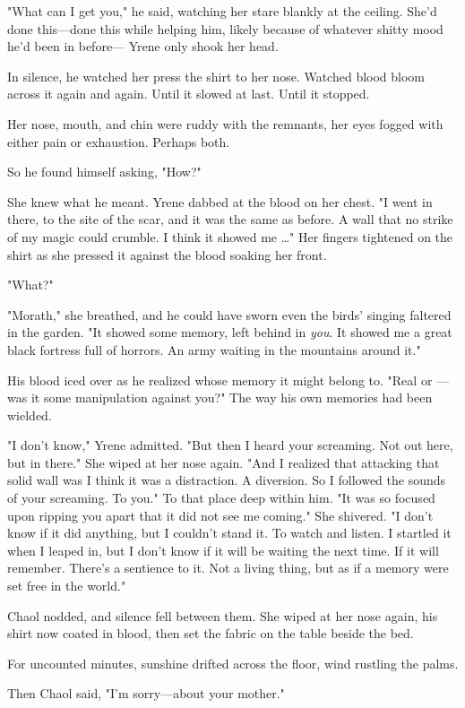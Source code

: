 "What can I get you," he said, watching her stare blankly at the ceiling. She'd done this---done this while helping him, likely because of whatever shitty mood he'd been in before--- Yrene only shook her head.

In silence, he watched her press the shirt to her nose. Watched blood bloom across it again and again. Until it slowed at last. Until it stopped.

Her nose, mouth, and chin were ruddy with the remnants, her eyes fogged with either pain or exhaustion. Perhaps both.

So he found himself asking, "How?"

She knew what he meant. Yrene dabbed at the blood on her chest. "I went in there, to the site of the scar, and it was the same as before. A wall that no strike of my magic could crumble. I think it showed me \ldots" Her fingers tightened on the shirt as she pressed it against the blood soaking her front.

"What?"

"Morath," she breathed, and he could have sworn even the birds' singing faltered in the garden. "It showed some memory, left behind in
\emph{you}. It showed me a great black fortress full of horrors. An army waiting in the mountains around it."

His blood iced over as he realized whose memory it might belong to. "Real or ---was it some manipulation against you?" The way his own memories had been wielded.

"I don't know," Yrene admitted. "But then I heard your screaming. Not out here, but  in there." She wiped at her nose again. "And I realized that attacking that solid wall was  I think it was a distraction. A diversion. So I followed the sounds of your screaming. To you." To that place deep within him. "It was so focused upon ripping you apart that it did not see me coming." She shivered. "I don't know if it did anything, but  I couldn't stand it. To watch and listen. I startled it when I leaped in, but I don't know if it will be waiting the next time. If it will remember. There's a  sentience to it. Not a living thing, but as if a memory were set free in the world."

Chaol nodded, and silence fell between them. She wiped at her nose again, his shirt now coated in blood, then set the fabric on the table beside the bed.

For uncounted minutes, sunshine drifted across the floor, wind rustling the palms.

Then Chaol said, "I'm sorry---about your mother."


